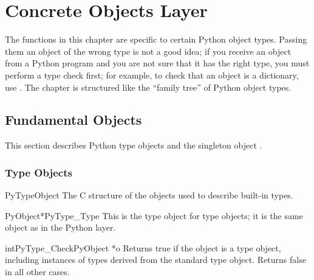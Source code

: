 \chapter{Concrete Objects Layer \label{concrete}}


The functions in this chapter are specific to certain Python object
types.  Passing them an object of the wrong type is not a good idea;
if you receive an object from a Python program and you are not sure
that it has the right type, you must perform a type check first;
for example, to check that an object is a dictionary, use
.  The chapter is structured like the
``family tree'' of Python object types.



\section{Fundamental Objects \label{fundamental}}

This section describes Python type objects and the singleton object
.


\subsection{Type Objects \label{typeObjects}}

\begin{ctypedesc}{PyTypeObject}
  The C structure of the objects used to describe built-in types.
\end{ctypedesc}

\begin{cvardesc}{PyObject*}{PyType_Type}
  This is the type object for type objects; it is the same object as
   in the Python layer.
\end{cvardesc}

\begin{cfuncdesc}{int}{PyType_Check}{PyObject *o}
  Returns true if the object  is a type object, including
  instances of types derived from the standard type object.  Returns
  false in all other cases.
\end{cfuncdesc}

